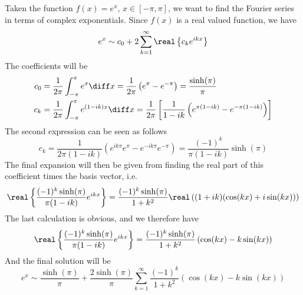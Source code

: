 \documentclass[../mmf.tex]{subfiles}
\begin{document}
\begin{eg}
	Taken the function $f(x)=e^x$, $x\in[-\pi,\pi]$, we want to find the Fourier series in terms of complex exponentials. Since $f(x)$ is a real valued function, we have
	\begin{equation*}
		e^x\sim c_0+2\sum_{k=1}^{\infty}\real\left\{ c_ke^{ikx} \right\}
	\end{equation*}
	The coefficients will be
	\begin{equation*}
		\begin{aligned}
			c_0&=\frac{1}{2\pi}\int_{-\pi}^{\pi}e^x\diff x=\frac{1}{2\pi}\left( e^{\pi}-e^{-\pi} \right)=\frac{\sinh(\pi)}{\pi}\\
			c_k&=\frac{1}{2\pi}\int_{-\pi}^{\pi}e^{(1-ik)x}\diff x=\frac{1}{2\pi}\left[ \frac{1}{1-ik}\left( e^{\pi(1-ik)}-e^{-\pi(1-ik)} \right) \right]
		\end{aligned}
	\end{equation*}
	The second expression can be seen as follows
	\begin{equation*}
		c_k=\frac{1}{2\pi(1-ik)}\left( e^{ik\pi}e^\pi-e^{-ik\pi}e^{-\pi} \right)=\frac{(-1)^k}{\pi(1-ik)}\sinh(\pi)
	\end{equation*}
	The final expansion will then be given from finding the real part of this coefficient times the basis vector, i.e.
	\begin{equation*}
		\real\left\{ \frac{(-1)^k\sinh(\pi)}{\pi(1-ik)}e^{ikx} \right\}=\frac{(-1)^k\sinh(\pi)}{1+k^2}\real\left( (1+ik)(\cos(kx)+i\sin(kx)) \right)
	\end{equation*}
	The last calculation is obvious, and we therefore have
	\begin{equation*}
		\real\left\{ \frac{(-1)^k\sinh(\pi)}{\pi(1-ik)}e^{ikx} \right\}=\frac{(-1)^k\sinh(\pi)}{1+k^2}\left( \cos(kx)-k\sin(kx) \right)
	\end{equation*}
	And the final solution will be
	\begin{equation*}
		e^x\sim\frac{\sinh(\pi)}{\pi}+\frac{2\sinh(\pi)}{\pi}\sum_{k=1}^{\infty}\frac{(-1)^k}{1+k^2}\left( \cos(kx)-k\sin(kx) \right)
	\end{equation*}
\end{eg}
\end{document}
